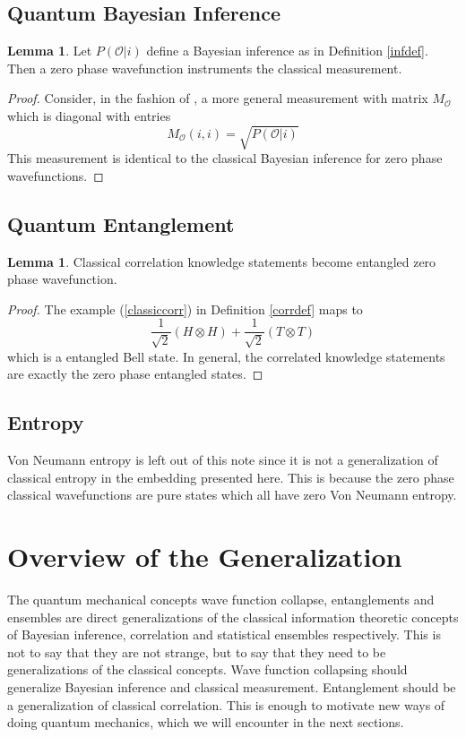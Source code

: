 \documentclass[12pt,a4paper]{article}
\theoremstyle{myrule}
\theoremstyle{postulate}
\theoremstyle{definition}
\newtheorem{lemma}[theorem]{Lemma}
\begin{document}
\subsection{Quantum Bayesian Inference}
\begin{lemma}
  Let $P(\mathcal{O} | i)$ define a Bayesian inference as in Definition \ref{infdef}.  Then a zero phase wavefunction instruments the classical measurement.
\end{lemma}
\begin{proof}
Consider, in the fashion of \cite{nielsenchuang}, a more general measurement with matrix $M_\mathcal{O}$ which is diagonal with entries
\[
   M_\mathcal{O}(i,i) = \sqrt{P(\mathcal{O} | i)}
\]
This measurement is identical to the classical Bayesian inference for zero phase wavefunctions.
\end{proof}

\subsection{Quantum Entanglement}
\begin{lemma}
  Classical correlation knowledge statements become entangled zero phase wavefunction.
\end{lemma}
\begin{proof}
  The example (\ref{classiccorr}) in Definition \ref{corrdef} maps to
  \[
  \frac{1}{\sqrt{2}} (H \otimes H) + \frac{1}{\sqrt{2}} (T \otimes T)
  \]
which is a entangled Bell state.  In general, the correlated knowledge statements are exactly the zero phase entangled states.
\end{proof}
\subsection{Entropy}
Von Neumann entropy is left out of this note since it is not a generalization of classical entropy in the embedding presented here.  This is because the zero phase classical wavefunctions are pure states which all have zero Von Neumann entropy.

\section{Overview of the Generalization}

The quantum mechanical concepts wave function collapse, entanglements and ensembles are direct generalizations of the classical information theoretic concepts of Bayesian inference, correlation and statistical ensembles respectively.  This is not to say that they are not strange, but to say that they need to be generalizations of the classical concepts.  Wave function collapsing should generalize Bayesian inference and classical measurement.  Entanglement should be a generalization of classical correlation.  This is enough to motivate new ways of doing quantum mechanics, which we will encounter in the next sections.
\end{document}

